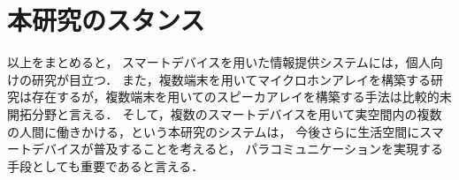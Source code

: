 \section{本研究のスタンス}

以上をまとめると，
スマートデバイスを用いた情報提供システムには，個人向けの研究が目立つ．
また，複数端末を用いてマイクロホンアレイを構築する研究は存在するが，複数端末を用いてのスピーカアレイを構築する手法は比較的未開拓分野と言える．
そして，複数のスマートデバイスを用いて実空間内の複数の人間に働きかける，という本研究のシステムは，
今後さらに生活空間にスマートデバイスが普及することを考えると，
パラコミュニケーションを実現する手段としても重要であると言える．


